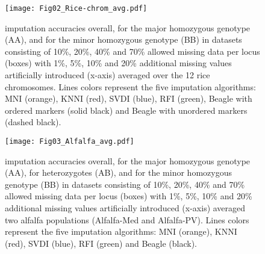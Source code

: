 \begin{figure}
\texttt{[image: Fig02\_Rice-chrom\_avg.pdf]}
\caption[Rice imputation accuracies]{
imputation accuracies overall, for the major homozygous genotype (AA), and for the minor homozygous genotype (BB) in datasets consisting of 10\%, 20\%, 40\% and 70\% allowed missing data per locus (boxes) with 1\%, 5\%, 10\% and 20\% additional missing values artificially introduced (x-axis) averaged over the 12 rice chromosomes. Lines colors represent the five imputation algorithms: MNI (orange), KNNI (red), SVDI (blue), RFI (green), Beagle with ordered markers (solid black) and Beagle with unordered markers (dashed black).}
\label{fig:accuracy_rice}
\end{figure}

\begin{figure}
\texttt{[image: Fig03\_Alfalfa\_avg.pdf]}
\caption[Alfalfa imputation accuracies]{
imputation accuracies overall, for the major homozygous genotype (AA), for heterozygotes (AB), and for the minor homozygous genotype (BB) in datasets consisting of 10\%, 20\%, 40\% and 70\% allowed missing data per locus (boxes) with 1\%, 5\%, 10\% and 20\% additional missing values artificially introduced (x-axis) averaged two alfalfa populations (Alfalfa-Med and Alfalfa-PV). Lines colors represent the five imputation algorithms: MNI (orange), KNNI (red), SVDI (blue), RFI (green) and Beagle (black).}
\label{fig:accuracy_alfalfa}
\end{figure}

